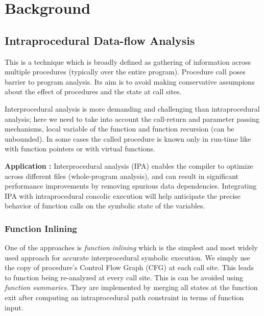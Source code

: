 \documentclass[12pt,oneside]{book}
\begin{document}

\newpage
\chapter{Background}


\section {Intraprocedural Data-flow Analysis}
This is a technique which is broadly defined as gathering of information across multiple procedures (typically over the entire program). Procedure call poses barrier to program analysis. Its aim is to avoid making conservative assumpions about the effect of procedures and the state at call sites.

Interprocedural analysis is more demanding and challenging than intraprocedural analysis; here we need to take into account the call-return and parameter passing mechanisms, local variable of the function and function recursion (can be unbounded). In some cases the called procedure is known only in run-time like with function pointers or with virtual functions. 

\textbf{Application :} Interprocedural analysis (IPA) enables the compiler to optimize across different files (whole-program analysis), and can result in significant performance improvements by removing spurious data dependencies. Integrating IPA with intraprocedural concolic execution will help anticipate the precise behavior of function calls on the symbolic state of the variables.


\subsection {Function Inlining}
One of the approaches is \textit{function inlining} which is the simplest and most widely used approach for accurate interprocedural symbolic execution. We simply use the copy of procedure's Control Flow Graph (CFG) at each call site. This leads to function being re-analyzed at every call site. This is can be avoided using \textit{function summaries}. They are implemented by merging all states at the function exit after computing an intraprocedural path constraint in terms of function input.\\ 
\end{document}
